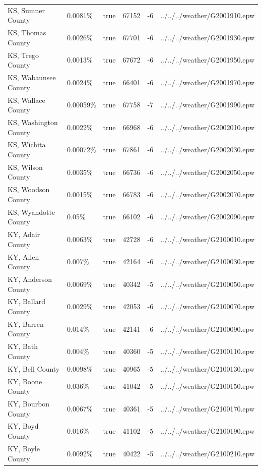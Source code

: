 \begin{longtable}[]{@{}llllll@{}}
KS, Sumner County & 0.0081\% & true & 67152 & -6 &
../../../weather/G2001910.epw \\
KS, Thomas County & 0.0026\% & true & 67701 & -6 &
../../../weather/G2001930.epw \\
KS, Trego County & 0.0013\% & true & 67672 & -6 &
../../../weather/G2001950.epw \\
KS, Wabaunsee County & 0.0024\% & true & 66401 & -6 &
../../../weather/G2001970.epw \\
KS, Wallace County & 0.00059\% & true & 67758 & -7 &
../../../weather/G2001990.epw \\
KS, Washington County & 0.0022\% & true & 66968 & -6 &
../../../weather/G2002010.epw \\
KS, Wichita County & 0.00072\% & true & 67861 & -6 &
../../../weather/G2002030.epw \\
KS, Wilson County & 0.0035\% & true & 66736 & -6 &
../../../weather/G2002050.epw \\
KS, Woodson County & 0.0015\% & true & 66783 & -6 &
../../../weather/G2002070.epw \\
KS, Wyandotte County & 0.05\% & true & 66102 & -6 &
../../../weather/G2002090.epw \\
KY, Adair County & 0.0063\% & true & 42728 & -6 &
../../../weather/G2100010.epw \\
KY, Allen County & 0.007\% & true & 42164 & -6 &
../../../weather/G2100030.epw \\
KY, Anderson County & 0.0069\% & true & 40342 & -5 &
../../../weather/G2100050.epw \\
KY, Ballard County & 0.0029\% & true & 42053 & -6 &
../../../weather/G2100070.epw \\
KY, Barren County & 0.014\% & true & 42141 & -6 &
../../../weather/G2100090.epw \\
KY, Bath County & 0.004\% & true & 40360 & -5 &
../../../weather/G2100110.epw \\
KY, Bell County & 0.0098\% & true & 40965 & -5 &
../../../weather/G2100130.epw \\
KY, Boone County & 0.036\% & true & 41042 & -5 &
../../../weather/G2100150.epw \\
KY, Bourbon County & 0.0067\% & true & 40361 & -5 &
../../../weather/G2100170.epw \\
KY, Boyd County & 0.016\% & true & 41102 & -5 &
../../../weather/G2100190.epw \\
KY, Boyle County & 0.0092\% & true & 40422 & -5 &
../../../weather/G2100210.epw \\

\end{longtable}
